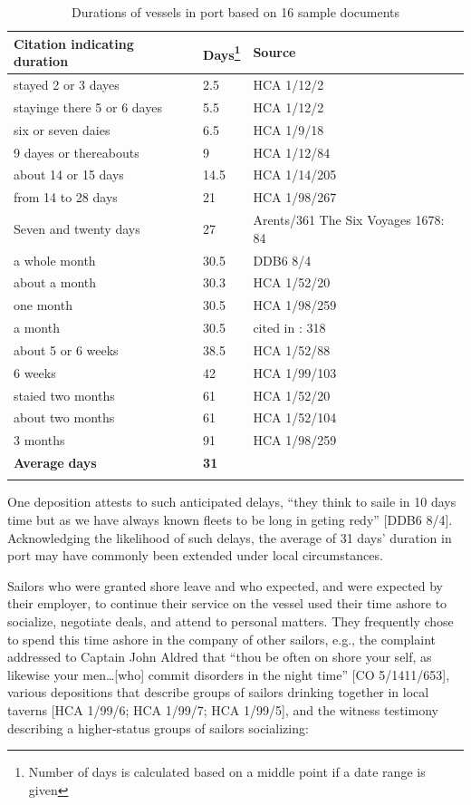 \begin{table}
\caption{\label{tab:key:4.4} Durations of vessels in port based on 16 sample documents}

\begin{tabularx}{\textwidth}{Qll}
\lsptoprule
\textbf{Citation} \textbf{indicating} \textbf{duration} & \textbf{Days}\footnote{Number of days is calculated based on a middle point if a date range is given} & \textbf{Source}\\
\midrule
 stayed 2 or 3 dayes & 2.5 & HCA 1/12/2\\
stayinge there 5 or 6 dayes & 5.5 & HCA 1/12/2\\
six or seven daies & 6.5 & HCA 1/9/18\\
9 dayes or thereabouts & 9 & HCA 1/12/84\\
about 14 or 15 days & 14.5 & HCA 1/14/205\\
from 14 to 28 days & 21 & HCA 1/98/267\\
Seven and twenty days & 27 & Arents/361 The Six  {Voyages 1678}: 84\\
a whole month & 30.5 & DDB6 8/4\\
about a month & 30.3 & HCA 1/52/20\\
one month & 30.5 & HCA 1/98/259\\
a month & 30.5 & cited in \citealt{Bicheno2012}: 318\\
about 5 or 6 weeks & 38.5 & HCA 1/52/88\\
6 weeks & 42 & HCA 1/99/103\\
staied two months & 61 & HCA 1/52/20\\
about two months & 61 & HCA 1/52/104\\
3 months & 91 & HCA 1/98/259\\
\midrule 
 \textbf{Average} \textbf{days} & \textbf{31} & \\
\lspbottomrule
\end{tabularx} 
\end{table}

One deposition attests to such anticipated delays, “they think to saile in 10 days time but as we have always known fleets to be long in geting redy” [DDB6 8/4]. Acknowledging the likelihood of such delays, the average of 31 days’ duration in port may have commonly been extended under local circumstances.

Sailors who were granted shore leave and who expected, and were expected by their employer, to continue their service on the vessel used their time ashore to socialize, negotiate deals, and attend to personal matters. They frequently chose to spend this time ashore in the company of other sailors, e.g., the complaint addressed to Captain John Aldred that “thou be often on shore your self, as likewise your men…[who] commit disorders in the night time” [CO 5/1411/653], various depositions that describe groups of sailors drinking together in local taverns [HCA 1/99/6; HCA 1/99/7; HCA 1/99/5], and the witness testimony describing a higher-status groups of sailors socializing:

